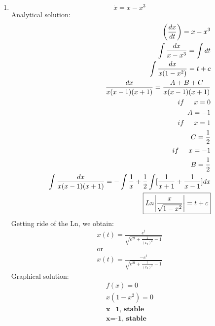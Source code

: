 \documentclass[a4paper,10pt]{article}
\begin{document}
\begin{enumerate}
\begin{enumerate}
				\newpage	
		\item 
		   \begin{equation}
		        \dot{x}=x-x^3
		    \end{equation}
		    Analytical solution:
		    \begin{equation}
		        \begin{aligned}
    		        \left( \frac{dx}{dt} \right)=x-x^3\\
    		        \int \frac{dx}{x-x^3}  = \int dt \\
    		        \int \frac{dx}{x(1-x^2)}  =t+c \\
    		        \frac{dx}{x(x-1)(x+1)}  = \frac{A+B+C}{x(x-1)(x+1)}\\
    		            if \hspace{0.5cm} x=0\\
    		                A=-1\\
    		            if  \hspace{0.5cm} x=1\\
    		                C=\frac{1}{2}\\
    		            if  \hspace{0.5cm} x=-1\\
    		                B=\frac{1}{2}\\
    		        \int \frac{dx}{x(x-1)(x+1)}=-\int\frac{1}{x} + \frac{1}{2}\int[\frac{1}{x+1} + \frac{1}{x-1}]dx \\
    		        \boxed{Ln\abs{\frac{x}{\sqrt{1-x^2}}}= t + c}
    		    \end{aligned}
		    \end{equation}
		    Getting ride of the Ln, we obtain:
		    \begin{equation}
		        \begin{aligned}
		            \boxed{x(t)=\frac{e^{t}}{\sqrt{e^{2t}+\frac{1}{(x_{0})^2}-1}}}\\
		            \text{or}\\
		            \boxed{x(t)=\frac{-e^{t}}{\sqrt{e^{2t}+\frac{1}{(x_{0})^2}-1}}}
		        \end{aligned}
		    \end{equation}
		    Graphical solution:
		   \begin{equation}
    		   \begin{aligned}
    		        f(x)=0\\
        		   x(1-x^2)=0\\
        		   \textbf{x=1, stable}\\
        		   \textbf{x=-1, stable}

\end{aligned}
\end{equation}
\end{enumerate}
\end{enumerate}
\end{document}
